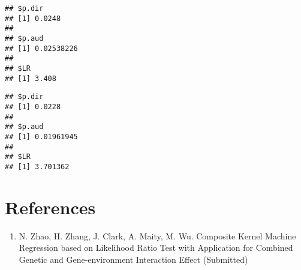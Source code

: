 \documentclass[11pt,]{article}
\newenvironment{Shaded}{\begin{snugshade}}{\end{snugshade}}
\newcommand{\KeywordTok}[1]{\textcolor[rgb]{0.13,0.29,0.53}{\textbf{#1}}}
\newcommand{\DataTypeTok}[1]{\textcolor[rgb]{0.13,0.29,0.53}{#1}}
\newcommand{\StringTok}[1]{\textcolor[rgb]{0.31,0.60,0.02}{#1}}
\newcommand{\OperatorTok}[1]{\textcolor[rgb]{0.81,0.36,0.00}{\textbf{#1}}}
\newcommand{\NormalTok}[1]{#1}
\providecommand{\tightlist}{%
\setlength{\itemsep}{0pt}\setlength{\parskip}{0pt}}
\begin{document}
\begin{verbatim}
## $p.dir
## [1] 0.0248
## 
## $p.aud
## [1] 0.02538226
## 
## $LR
## [1] 3.408
\end{verbatim}

\begin{Shaded}
\end{Shaded}

\begin{verbatim}
## $p.dir
## [1] 0.0228
## 
## $p.aud
## [1] 0.01961945
## 
## $LR
## [1] 3.701362
\end{verbatim}

\section{References}\label{references}

\begin{enumerate}
\def\labelenumi{\arabic{enumi}.}
\tightlist
\item
  N. Zhao, H. Zhang, J. Clark, A. Maity, M. Wu. Composite Kernel Machine
  Regression based on Likelihood Ratio Test with Application for
  Combined Genetic and Gene-environment Interaction Effect (Submitted)
\end{enumerate}




\newpage
\singlespacing 
\end{document}
